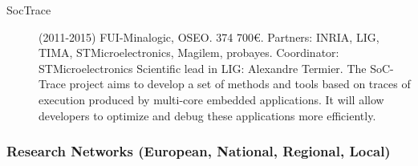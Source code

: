 \begin{description}
\item[ SocTrace] (2011-2015)  FUI-Minalogic, OSEO. 374 700\euro. Partners: INRIA, LIG, TIMA, STMicroelectronics, Magilem, probayes. Coordinator: STMicroelectronics
Scientific lead in LIG: Alexandre Termier.  The SoC-Trace project aims to develop a set of methods and tools based on traces of execution produced by multi-core embedded applications. It will allow developers to optimize and debug these applications more efficiently. 

\end{description}

\subsubsection{Research Networks (European, National, Regional, Local)}

